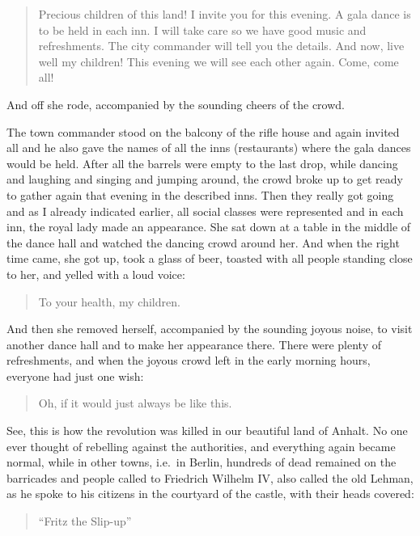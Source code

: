 \begin{quote}
Precious children of this land! I invite you for this evening. A gala dance is to be held in each inn. I will take care so we have good music and refreshments. The city commander will tell you the details. And now, live well my children! This evening we will see each other again. Come, come all!
\end{quote}

And off she rode, accompanied by the sounding cheers of the crowd.

The town commander stood on the balcony of the rifle house and again invited all and he also gave the names of all the inns (restaurants) where the gala dances would be held. After all the barrels were empty to the last drop, while dancing and laughing and singing and jumping around, the crowd broke up to get ready to gather again that evening in the described inns. Then they really got going and as I already indicated earlier, all social classes were represented and in each inn, the royal lady made an appearance. She sat down at a table in the middle of the dance hall and watched the dancing crowd around her. And when the right time came, she got up, took a glass of beer, toasted with all people standing close to her, and yelled with a loud voice:

\begin{quote}
To your health, my children.
\end{quote}

And then she removed herself, accompanied by the sounding joyous noise, to visit another dance hall and to make her appearance there. There were plenty of refreshments, and when the joyous crowd left in the early morning hours, everyone had just one wish:

\begin{quote}
Oh, if it would just always be like this.
\end{quote}

See, this is how the revolution was killed in our beautiful land of Anhalt. No one ever thought of rebelling against the authorities, and everything again became normal, while in other towns, i.e.~in Berlin, hundreds of dead remained on the barricades and people called to Friedrich Wilhelm IV, also called the old Lehman, as he spoke to his citizens in the courtyard of the castle, with their heads covered:

\begin{quote}
``Fritz the Slip-up''
\end{quote}

